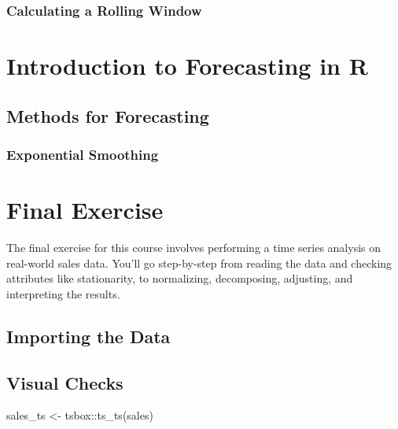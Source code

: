 \documentclass[
]{book}
\newenvironment{Shaded}{\begin{snugshade}}{\end{snugshade}}
\newcommand{\FunctionTok}[1]{\textcolor[rgb]{0.00,0.00,0.00}{#1}}
\newcommand{\NormalTok}[1]{#1}
\newcommand{\OtherTok}[1]{\textcolor[rgb]{0.56,0.35,0.01}{#1}}
\newcommand{\SpecialCharTok}[1]{\textcolor[rgb]{0.00,0.00,0.00}{#1}}
\begin{document}
\hypertarget{calculating-a-rolling-window}{%
\subsection{Calculating a Rolling Window}\label{calculating-a-rolling-window}}

\hypertarget{introduction-to-forecasting-in-r}{%
\chapter{Introduction to Forecasting in R}\label{introduction-to-forecasting-in-r}}

\hypertarget{methods-for-forecasting}{%
\section{Methods for Forecasting}\label{methods-for-forecasting}}

\hypertarget{exponential-smoothing}{%
\subsection{Exponential Smoothing}\label{exponential-smoothing}}

\hypertarget{final-exercise}{%
\chapter{Final Exercise}\label{final-exercise}}

The final exercise for this course involves performing a time series analysis on real-world sales data. You'll go step-by-step from reading the data and checking attributes like stationarity, to normalizing, decomposing, adjusting, and interpreting the results.

\hypertarget{importing-the-data}{%
\section{Importing the Data}\label{importing-the-data}}

\hypertarget{visual-checks}{%
\section{Visual Checks}\label{visual-checks}}

\begin{Shaded}
\begin{Highlighting}[]
\NormalTok{sales\_ts }\OtherTok{\textless{}{-}}\NormalTok{ tsbox}\SpecialCharTok{::}\FunctionTok{ts\_ts}\NormalTok{(sales)}
\end{Highlighting}
\end{Shaded}
\end{document}
